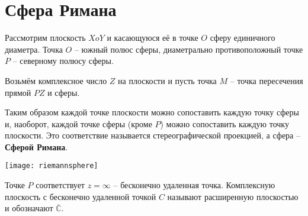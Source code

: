 \section{Сфера Римана}

Рассмотрим плоскость $XoY$ и касающуюся её в точке $O$ сферу
единичного диаметра. Точка $O$ -- южный полюс сферы, диаметрально
противоположный точке $P$ -- северному полюсу сферы. 

Возьмём комплексное число $Z$ на плоскости и пусть точка $M$ --
точка пересечения прямой $PZ$ и сферы.

Таким образом каждой точке плоскости можно сопоставить каждую точку 
сферы и, наоборот, каждой точке сферы (кроме $P$) можно сопоставить
каждую точку плоскости. Это соответствие называется стереографической
проекцией, а сфера -- \textbf{Сферой Римана}. 

\texttt{[image: riemannsphere]}

Точке $P$ соответствует $z = \infty$ -- бесконечно удаленная точка.
Комплексную плоскость с бесконечно удаленной точкой $C$ называют
расширенную плоскостью и обозначают $\overline{\mathbb{C}}$.

